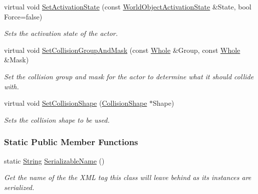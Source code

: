 \begin{DoxyCompactItemize}
virtual void \hyperlink{classMezzanine_1_1WorldObjectPhysicsSettings_ae90ebe8b69ab256702f178c71cf1af47}{SetActivationState} (const \hyperlink{namespaceMezzanine_ac4d9d4570b1963390325ad6a083108e1}{WorldObjectActivationState} \&State, bool Force=false)
\begin{DoxyCompactList}\small\item\em Sets the activation state of the actor. \item\end{DoxyCompactList}\item 
virtual void \hyperlink{classMezzanine_1_1WorldObjectPhysicsSettings_a46d794796272ed68fffb32a91d4a6420}{SetCollisionGroupAndMask} (const \hyperlink{namespaceMezzanine_adcbb6ce6d1eb4379d109e51171e2e493}{Whole} \&Group, const \hyperlink{namespaceMezzanine_adcbb6ce6d1eb4379d109e51171e2e493}{Whole} \&Mask)
\begin{DoxyCompactList}\small\item\em Set the collision group and mask for the actor to determine what it should collide with. \item\end{DoxyCompactList}\item 
virtual void \hyperlink{classMezzanine_1_1WorldObjectPhysicsSettings_ae8b786e26eed334b283156b442807039}{SetCollisionShape} (\hyperlink{classMezzanine_1_1CollisionShape}{CollisionShape} $\ast$Shape)
\begin{DoxyCompactList}\small\item\em Sets the collision shape to be used. \item\end{DoxyCompactList}\end{DoxyCompactItemize}
\subsubsection*{Static Public Member Functions}
\begin{DoxyCompactItemize}
\item 
static \hyperlink{namespaceMezzanine_acf9fcc130e6ebf08e3d8491aebcf1c86}{String} \hyperlink{classMezzanine_1_1WorldObjectPhysicsSettings_aeb904cc45c213f55febfe397f7bc639b}{SerializableName} ()
\begin{DoxyCompactList}\small\item\em Get the name of the the XML tag this class will leave behind as its instances are serialized. \item\end{DoxyCompactList}\end{DoxyCompactItemize}
